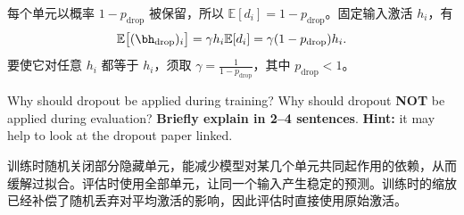 \begin{parts}
\begin{subparts}
            
                \par\begin{answer}
                    每个单元以概率 $1-p_{\text{drop}}$ 被保留，所以 $\mathbb{E}[d_i]=1-p_{\text{drop}}$。固定输入激活 $h_i$，有
                    \[
                        \mathbb{E}\bigl[(\bh_{\text{drop}})_i\bigr]
                        = \gamma h_i \mathbb{E}[d_i]
                        = \gamma (1-p_{\text{drop}})h_i.
                    \]
                    要使它对任意 $h_i$ 都等于 $h_i$，须取
                    $\displaystyle \gamma=\frac{1}{1-p_{\text{drop}}}$，其中 $p_{\text{drop}}<1$。
                \end{answer}

          \subpart[2] Why should dropout be applied during training? Why should dropout \textbf{NOT} be applied during evaluation? \textbf{Briefly explain in 2--4 sentences}. \textbf{Hint:} it may help to look at the dropout paper linked. \newline
                \begin{answer}
                    训练时随机关闭部分隐藏单元，能减少模型对某几个单元共同起作用的依赖，从而缓解过拟合。评估时使用全部单元，让同一个输入产生稳定的预测。训练时的缩放已经补偿了随机丢弃对平均激活的影响，因此评估时直接使用原始激活。
                \end{answer}
          
         
        \end{subparts}


\end{parts}

